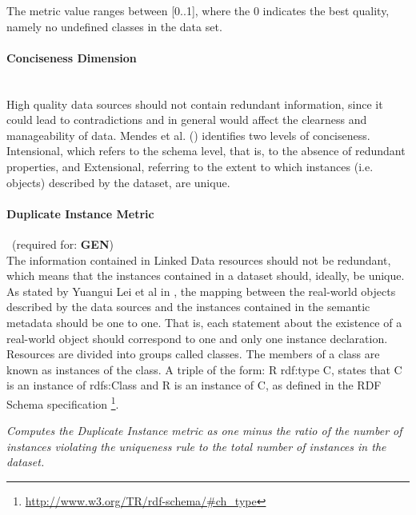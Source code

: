 The metric value ranges between [0..1], where  the 0 indicates the best quality, namely no undefined classes in the data set.

\paragraph{Conciseness Dimension}~\\ %
High quality data sources should not contain redundant information, since it could lead to contradictions and in general would affect the clearness and manageability of data. Mendes et al. (\cite{Mendes2012}) identifies two levels of conciseness. Intensional, which refers to the schema level, that is, to the absence of redundant properties, and Extensional, referring to the extent to which instances (i.e. objects) described by the dataset, are unique.

\paragraph{Duplicate Instance Metric}~(required for: \textbf{GEN})~\\
The information contained in Linked Data resources should not be redundant, which means that the instances contained in a dataset should, ideally, be unique. As stated by Yuangui Lei et al in \cite{Lei2007}, the mapping between the real-world objects described by the data sources and the instances contained in the semantic metadata should be one to one. That is, each statement about the existence of a real-world object should correspond to one and only one instance declaration.
Resources are divided into groups called classes. The members of a class are known as instances of the class. A triple of the form: R rdf:type C, states that C is an instance of rdfs:Class and R is an instance of C, as defined in the RDF Schema specification \footnote{\url{http://www.w3.org/TR/rdf-schema/#ch_type}}.

\begin{mdframed}[style=metricdefinition]
\emph{Computes the Duplicate Instance metric as one minus the ratio of the number of instances violating the uniqueness rule to the total number of instances in the dataset.}
\end{mdframed}

